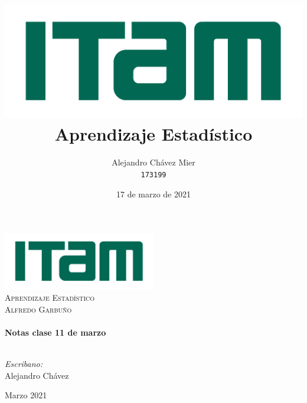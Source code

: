\title{
\includegraphics[scale=0.25]{logo_ITAM.png}
\\ 
\textbf{Aprendizaje Estadístico} \\
}

\author{
  Alejandro Chávez Mier\\
  \texttt{173199}
}
\date{17 de marzo de 2021}





\begin{titlepage}
\vbox{ }

\vbox{ }

\begin{center}
\includegraphics[width=0.5\textwidth]{logo_ITAM.png}\\[1cm]
\textsc{\LARGE Aprendizaje Estadístico}\\
\textsc{\Large Alfredo Garbuño}\\[0.5cm]

\vbox{ }
\HRule \\[0.4cm]
{ \huge \bfseries Notas clase 11 de marzo}\\[0.4cm]
\HRule \\[1.5cm]
\begin{minipage}{0.4\textwidth}
\begin{flushleft} \large
\emph{Escribano:}\\
Alejandro Chávez
\end{flushleft}
\end{minipage}

\vfill
{\large Marzo 2021}
\end{center}
\end{titlepage}